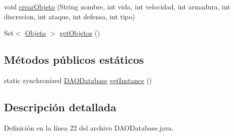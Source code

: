 \begin{DoxyCompactItemize}
\item 
void \hyperlink{classes_1_1deusto_1_1spq_1_1_t_e_scc_1_1servidor_1_1_d_a_o_database_ac81819c3e2f9b8ee4fa13061a40df03b}{crear\+Objeto} (String nombre, int vida, int velocidad, int armadura, int discrecion, int ataque, int defensa, int tipo)
\item 
Set$<$ \hyperlink{classes_1_1deusto_1_1spq_1_1_t_e_scc_1_1servidor_1_1jdo_1_1_objeto}{Objeto} $>$ \hyperlink{classes_1_1deusto_1_1spq_1_1_t_e_scc_1_1servidor_1_1_d_a_o_database_a41694a8e5f0bbd20fab394ac042b2c8b}{get\+Objetos} ()
\end{DoxyCompactItemize}
\subsection*{Métodos públicos estáticos}
\begin{DoxyCompactItemize}
\item 
static synchronized \hyperlink{classes_1_1deusto_1_1spq_1_1_t_e_scc_1_1servidor_1_1_d_a_o_database}{D\+A\+O\+Database} \hyperlink{classes_1_1deusto_1_1spq_1_1_t_e_scc_1_1servidor_1_1_d_a_o_database_af127a34cb9b89d13574da3774b5233e9}{get\+Instance} ()
\end{DoxyCompactItemize}


\subsection{Descripción detallada}


Definición en la línea 22 del archivo D\+A\+O\+Database.\+java.



